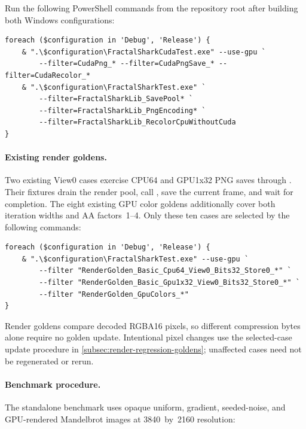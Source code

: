 Run the following PowerShell commands from the repository root after
building both Windows configurations:

\noindent\begin{minipage}{\linewidth}
\begin{lstlisting}[language={},upquote=true]
foreach ($configuration in 'Debug', 'Release') {
    & ".\$configuration\FractalSharkCudaTest.exe" --use-gpu `
        --filter=CudaPng_* --filter=CudaPngSave_* --filter=CudaRecolor_*
    & ".\$configuration\FractalSharkTest.exe" `
        --filter=FractalSharkLib_SavePool* `
        --filter=FractalSharkLib_PngEncoding* `
        --filter=FractalSharkLib_RecolorCpuWithoutCuda
}
\end{lstlisting}
\end{minipage}

\paragraph{Existing render goldens.}
Two existing View0 cases exercise CPU64 and GPU1x32 PNG saves through
. Their fixtures drain the render pool, call
, save the current frame, and wait for completion.
The eight existing GPU color goldens additionally cover both iteration widths
and AA factors~1--4. Only these ten cases are selected by the following commands:

\noindent\begin{minipage}{\linewidth}
\begin{lstlisting}[language={},upquote=true]
foreach ($configuration in 'Debug', 'Release') {
    & ".\$configuration\FractalSharkTest.exe" --use-gpu `
        --filter "RenderGolden_Basic_Cpu64_View0_Bits32_Store0_*" `
        --filter "RenderGolden_Basic_Gpu1x32_View0_Bits32_Store0_*" `
        --filter "RenderGolden_GpuColors_*"
}
\end{lstlisting}
\end{minipage}

Render goldens compare decoded RGBA16 pixels, so different compression
bytes alone require no golden update. Intentional pixel changes use the
selected-case update procedure in \cref{subsec:render-regression-goldens};
unaffected cases need not be regenerated or rerun.

\paragraph{Benchmark procedure.}
The standalone benchmark uses opaque uniform, gradient, seeded-noise,
and GPU-rendered Mandelbrot images at 3840~by~2160 resolution:

